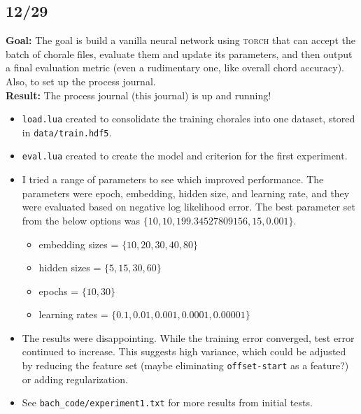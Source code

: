 \documentclass[12pt]{article}
\begin{document}
\subsection{12/29}
\textbf{Goal:} The goal is build a vanilla neural network using \textsc{torch} that can accept the batch of chorale files, evaluate them and update its parameters, and then output a final evaluation metric (even a rudimentary one, like overall chord accuracy). Also, to set up the process journal. \\
\textbf{Result: } The process journal (this journal) is up and running!
\begin{itemize}
\item \texttt{load.lua} created to consolidate the training chorales into one dataset, stored in \texttt{data/train.hdf5}.
\item \texttt{eval.lua} created to create the model and criterion for the first experiment. 
\item I tried a range of parameters to see which improved performance. The parameters were epoch, embedding, hidden size, and learning rate, and they were evaluated based on negative log likelihood error. The best parameter set from the below options was $\{10, 10, 199.34527809156, 15, 0.001\}$.
\begin{itemize}
\item embedding sizes = $\{10, 20, 30, 40, 80\}$
\item hidden sizes = $\{5, 15, 30, 60\}$
\item epochs = $\{10, 30\}$
\item learning rates = $\{0.1, 0.01, 0.001, 0.0001, 0.00001\}$
\end{itemize}
\item The results were disappointing. While the training error converged, test error continued to increase. This suggests high variance, which could be adjusted by reducing the feature set (maybe eliminating \texttt{offset-start} as a feature?) or adding regularization.
\item See \texttt{bach\_code/experiment1.txt} for more results from initial tests.
\end{itemize}
\end{document}
